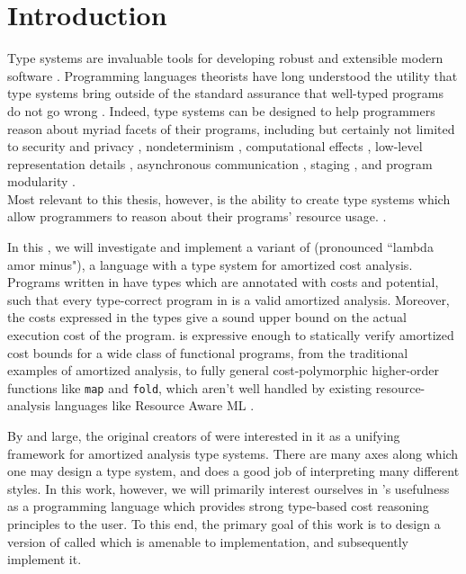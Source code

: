 \section{Introduction}
Type systems are invaluable tools for developing robust and extensible modern software \citehere. Programming languages theorists have long understood the utility that type systems bring outside of the standard assurance that well-typed programs do not go wrong \citehere. Indeed, type systems can be designed to help programmers reason about myriad facets of their programs, including but certainly not limited to security and privacy \citehere, nondeterminism \citehere, computational effects \citehere, low-level representation details , asynchronous communication , staging \citehere, and program modularity . 
\\

Most relevant to this thesis, however, is the ability to create type systems which allow programmers to reason about their programs' resource usage. .


In this , we will investigate and implement a variant of \lambdaamorminus (pronounced ``lambda amor minus"), a language with a type system for amortized cost analysis. Programs written in \lambdaamorminus have types which are annotated with costs and potential, such that every type-correct program in \lambdaamorminus is a valid amortized analysis. Moreover, the costs expressed in the types give a sound upper bound on the actual execution cost of the program. \lambdaamorminus is expressive enough to statically verify amortized cost bounds for a wide class of functional programs, from the traditional examples of amortized analysis, to fully general cost-polymorphic higher-order functions like \texttt{map} and \texttt{fold}, which aren't well handled by existing resource-analysis languages like Resource Aware ML \citehere. 

By and large, the original creators of \lambdaamorminus were interested in it as a unifying framework for amortized analysis type systems. There are many axes along which one may design a type system, and \lambdaamorminus does a good job of interpreting many different styles. In this work, however, we will primarily interest ourselves in \lambdaamorminus's usefulness as a programming language which provides strong type-based cost reasoning principles to the user. To this end, the primary goal of this work is to design a version of \lambdaamorminus called \dlambdaamor which is amenable to implementation, and subsequently implement it.


